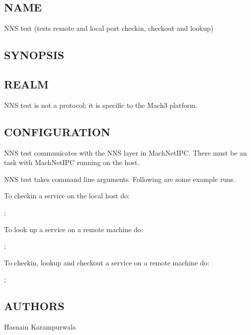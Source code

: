 %
%
%

\subsection*{NAME}

\noindent NNS test (tests remote and local port checkin, checkout and lookup)

\subsection*{SYNOPSIS}

\noindent 

\subsection*{REALM}

NNS test is not a protocol; it is specific to the Mach3 platform.

\subsection*{CONFIGURATION}

NNS test communicates with the NNS layer in MachNetIPC.  There must be 
an \xk{} task with MachNetIPC running on the host. 

NNS test takes command line arguments. Following are some example runs.

To checkin a service on the local host do:

;

To look up a service on a remote machine do:

;

To checkin, lookup and checkout a service on a remote machine do:

;

\subsection*{AUTHORS}

\noindent Hasnain Karampurwala
